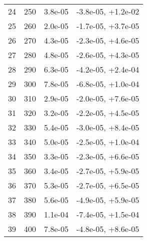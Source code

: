 \begin{table}
\begin{adjustbox}{width=1\textwidth/2}
\begin{tabular}{|c|c|c|c|}
\cline{1-4}
24 & 250 & 3.8e-05 & -3.8e-05, +1.2e-02 \\
\cline{1-4}
25 & 260 & 2.0e-05 & -1.7e-05, +3.7e-05 \\
\cline{1-4}
26 & 270 & 4.3e-05 & -2.3e-05, +4.6e-05 \\
\cline{1-4}
27 & 280 & 4.8e-05 & -2.6e-05, +4.3e-05 \\
\cline{1-4}
28 & 290 & 6.3e-05 & -4.2e-05, +2.4e-04 \\
\cline{1-4}
29 & 300 & 7.8e-05 & -6.8e-05, +1.0e-04 \\
\cline{1-4}
30 & 310 & 2.9e-05 & -2.0e-05, +7.6e-05 \\
\cline{1-4}
31 & 320 & 3.2e-05 & -2.2e-05, +4.5e-05 \\
\cline{1-4}
32 & 330 & 5.4e-05 & -3.0e-05, +8.4e-05 \\
\cline{1-4}
33 & 340 & 5.0e-05 & -2.5e-05, +1.0e-04 \\
\cline{1-4}
34 & 350 & 3.3e-05 & -2.3e-05, +6.6e-05 \\
\cline{1-4}
35 & 360 & 3.4e-05 & -2.7e-05, +5.9e-05 \\
\cline{1-4}
36 & 370 & 5.3e-05 & -2.7e-05, +6.5e-05 \\
\cline{1-4}
37 & 380 & 5.6e-05 & -4.9e-05, +5.9e-05 \\
\cline{1-4}
38 & 390 & 1.1e-04 & -7.4e-05, +1.5e-04 \\
\cline{1-4}
39 & 400 & 7.8e-05 & -4.8e-05, +8.6e-05 \\
\cline{1-4}
\end{tabular}
\end{adjustbox}
\end{table}

